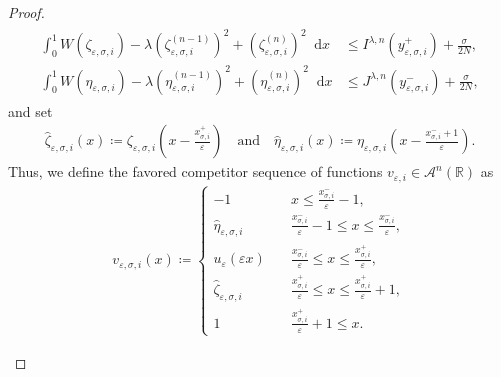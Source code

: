 \documentclass{article}
\newcommand{\dd}{\mathop{}\mathrm{d}} %
\newcommand{\lam}{\lambda}
\newcommand{\eps}{\varepsilon}
\numberwithin{figure}{section}
\def\AAA{{\mathcal A}} \def\calB{{\mathcal B}} \def\calC{{\mathcal C}}
\newcommand{\R}{\mathbb{R}}
\numberwithin{equation}{section}
\begin{document}
\begin{proof}
\begin{align}
\begin{split}
        \int_0^1 W(\zeta_{\eps,\sigma,i})-\lam(\zeta^{(n-1)}_{\eps,\sigma,i})^2+(\zeta^{(n)}_{\eps,\sigma,i})^2\dd x &\leq I^{\lam,n}(y^+_{\eps,\sigma,i}) + \frac \sigma{2N},\\
        \int_0^1 W(\eta_{\eps,\sigma,i})-\lam(\eta^{(n-1)}_{\eps,\sigma,i})^2+(\eta^{(n)}_{\eps,\sigma,i})^2\dd x &\leq J^{\lam,n}(y^-_{\eps,\sigma,i}) + \frac \sigma{2N},
    \end{split}
    \end{align}
    and set
    \begin{align}
        \hat{\zeta}_{\eps,\sigma,i}(x)\coloneq \zeta_{\eps,\sigma,i}\left(x-\frac{x_{\sigma,i}^+}{\eps}\right) \quad \text{and} \quad \hat{\eta}_{\eps,\sigma,i}(x)\coloneq \eta_{\eps,\sigma,i}\left(x-\frac{x_{\sigma,i}^-+1}{\eps}\right).
    \end{align}
    Thus, we define the favored competitor sequence of functions $v_{\eps,i} \in \AAA^n(\R)$ as  
    \begin{align}
        v_{\eps,\sigma,i}(x)\coloneq 
        \left\{\begin{array}{ll}
        -1 \quad & x \leq \frac{x_{\sigma,i}^-}{\eps} -1, \\
        \hat{\eta}_{\eps,\sigma,i} \quad & \frac{x_{\sigma,i}^-}{\eps}-1 \leq x \leq \frac{x_{\sigma,i}^-}{\eps}, \\
        u_\eps (\eps x) \quad & \frac{x_{\sigma,i}^-}{\eps}\leq x \leq \frac{x_{\sigma,i}^+}{\eps}, \\
        \hat{\zeta}_{\eps,\sigma,i} \quad & \frac{x_{\sigma,i}^+}{\eps} \leq x \leq \frac{x_{\sigma,i}^+}{\eps}+1, \\
        1 \quad & \frac{x_{\sigma,i}^+}{\eps} +1 \leq x.
        \end{array}\right.
    \end{align} 
    
\vspace{-0.3cm}
\begin{figure}[htb]
\centering   
{}
\end{figure}
\end{proof}
\end{document}
